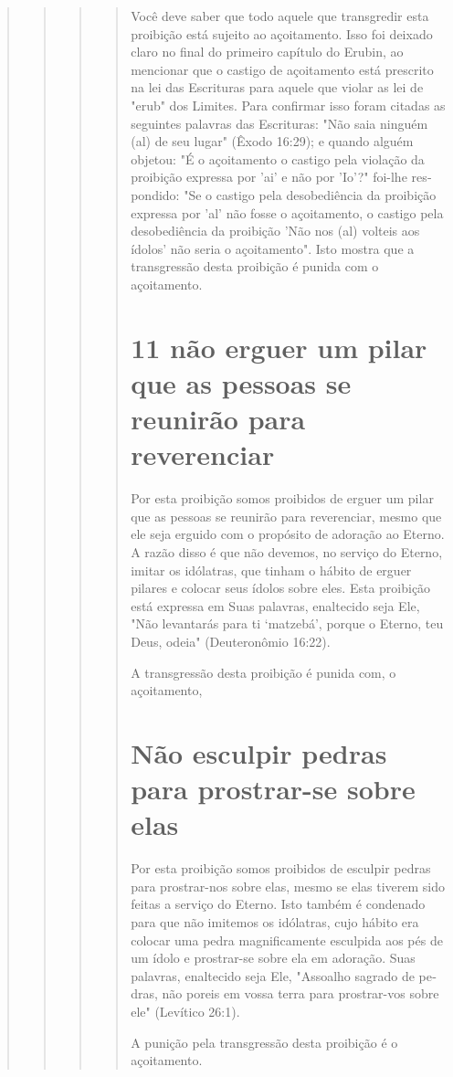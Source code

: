 \begin{quote}
\begin{quote}
\begin{quote}
\begin{quote}
Você deve saber que todo aquele que transgredir esta proibição está
sujeito ao açoitamento. Isso foi deixado claro no final do primeiro
capítulo do Erubin, ao mencionar que o castigo de açoitamento está
prescrito na lei das Escrituras para aquele que violar as lei de "erub"
dos Limites. Para confirmar isso foram citadas as seguintes palavras das
Escrituras: "Não saia ninguém (al) de seu lugar" (Êxodo 16:29); e quando
alguém objetou: "É o açoitamento o castigo pela violação da proibição
expressa por 'ai' e não por 'Io'?" foi-lhe res­pondido: "Se o castigo
pela desobediência da proibição expressa por 'al' não fosse o
açoitamento, o castigo pela desobediência da proibição 'Não nos (al)
volteis aos ídolos' não seria o açoitamento". Isto mostra que a
transgressão desta proibição é punida com o açoitamento.

\section{11 não erguer um pilar que as pessoas se reunirão para reverenciar}

Por esta proibição somos proibidos de erguer um pilar que as pessoas se
reunirão para reverenciar, mesmo que ele seja erguido com o propósito de
ado­ração ao Eterno. A razão disso é que não devemos, no serviço do
Eterno, imitar os idólatras, que tinham o hábito de erguer pilares e
colocar seus ídolos sobre eles. Esta proibição está expressa em Suas
palavras, enaltecido seja Ele, "Não levan­tarás para ti `matzebá',
porque o Eterno, teu Deus, odeia" (Deuteronômio 16:22).

A transgressão desta proibição é punida com, o açoitamento,

\section{Não esculpir pedras para prostrar-se sobre elas}

Por esta proibição somos proibidos de esculpir pedras para prostrar-nos
sobre elas, mesmo se elas tiverem sido feitas a serviço do Eterno. Isto
tam­bém é condenado para que não imitemos os idólatras, cujo hábito era
colocar
uma pedra magnificamente esculpida aos pés de um ídolo e prostrar-se
sobre ela em adoração. Suas palavras, enaltecido seja Ele, "Assoalho
sagrado de pe­dras, não poreis em vossa terra para prostrar-vos sobre
ele" (Levítico 26:1).

A punição pela transgressão desta proibição é o açoitamento.


\end{quote}
\end{quote}
\end{quote}
\end{quote}
